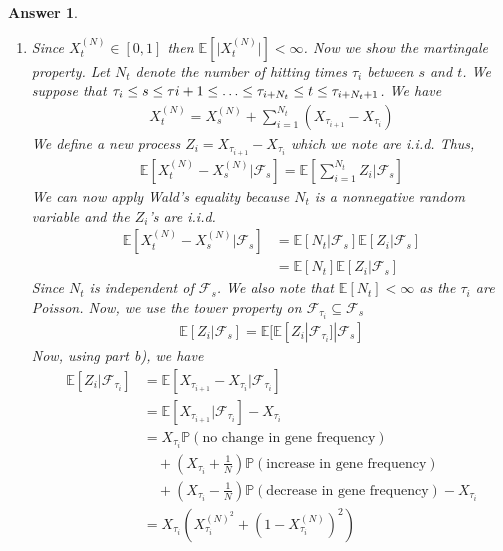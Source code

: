 \documentclass[12pt]{article}
\theoremstyle{colon}
\newtheorem*{answer}{Answer}
\begin{document}
\begin{answer}
\begin{enumerate}[label=\alph*)]
    \item Since $X_t^{(N)} \in [0,1]$ then $\mathbb{E} [ \lvert X_t^{(N)} \rvert ] < \infty$. Now  we show the martingale property. Let $N_t$ denote the number of hitting times $\tau_i$ between $s$ and $t$. We suppose that $\tau_i \leq s \leq \tau{i+1} \leq \mathellipsis \leq \tau_{i+N_t} \leq t \leq \tau_{i+N_t+1} $. We have
      \begin{gather*}
        X_t^{(N)} = X_s^{(N)} + \sum_{i=1}^{N_t} (X_{\tau_{i+1}} - X_{\tau_i})
      \end{gather*}
      We define a new process $Z_i = X_{\tau_{i+1}} - X_{\tau_i}$ which we note are i.i.d. Thus,
      \begin{gather*}
        \mathbb{E}[X_t^{(N)} - X_s^{(N)} | \mathcal{F}_s] = \mathbb{E}[\sum_{i=1}^{N_t} Z_i | \mathcal{F}_s]
      \end{gather*}
      We can now apply Wald's equality because $N_t$ is a nonnegative random variable and the $Z_i$'s are i.i.d.
      \begin{align*}
        \mathbb{E}[X_t^{(N)} - X_s^{(N)} | \mathcal{F}_s] &= \mathbb{E}[{N_t} | \mathcal{F}_s] \mathbb{E}[Z_i | \mathcal{F}_s] \\
        &= \mathbb{E}[{N_t}] \mathbb{E}[Z_i | \mathcal{F}_s]
      \end{align*}
      Since $N_t$ is independent of $\mathcal{F}_s$. We also note that $\mathbb{E}[N_t] < \infty$ as the $\tau_i$ are Poisson. Now, we use the tower property on $\mathcal{F}_{\tau_i} \subseteq \mathcal{F}_s$
      \begin{gather*}
        \mathbb{E}[Z_i | \mathcal{F}_s] = \mathbb{E}[\mathbb{E}[Z_i | \mathcal{F}_{\tau_i}] | \mathcal{F}_s]
      \end{gather*}
      Now, using part b), we have
      \begin{align*}
        \mathbb{E}[Z_i | \mathcal{F}_{\tau_i}] &= \mathbb{E}[ X_{\tau_{i+1}} - X_{\tau_i} | \mathcal{F}_{\tau_i}] \\
        &= \mathbb{E}[ X_{\tau_{i+1}} | \mathcal{F}_{\tau_i}] - X_{\tau_i} \\
        &= X_{\tau_i} \mathbb{P}(\text{no change in gene frequency}) \\
        &\quad + (X_{\tau_i} + \frac{1}{N}) \mathbb{P}(\text{increase in gene frequency}) \\
        &\quad + (X_{\tau_i} - \frac{1}{N}) \mathbb{P}(\text{decrease in gene frequency}) - X_{\tau_i}  \\
        &= X_{\tau_i} (X_{\tau_i}^{(N)^2} + (1-X_{\tau_i}^{(N)})^2) \\

\end{align*}
\end{enumerate}
\end{answer}
\end{document}
